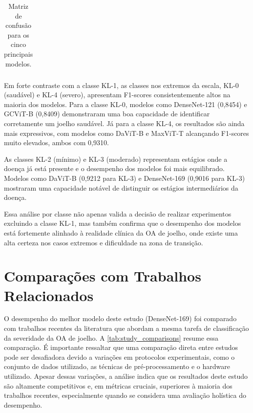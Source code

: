 \begin{table}[!htbp]
\begin{tabular}{|l|c|c|}
    \end{tabular}
    \caption{Matriz de confusão para os cinco principais modelos.}
    \label{tab:matrizes_confusao}
\end{table}

Em forte contraste com a classe KL-1, as classes nos extremos da escala, KL-0 (saudável) e KL-4 (severo), apresentam F1-scores consistentemente altos na maioria dos modelos. Para a classe KL-0, modelos como DenseNet-121 (0,8454) e GCViT-B (0,8409) demonstraram uma boa capacidade de identificar corretamente um joelho saudável. Já para a classe KL-4, os resultados são ainda mais expressivos, com modelos como DaViT-B e MaxViT-T alcançando F1-scores muito elevados, ambos com 0,9310.

As classes KL-2 (mínimo) e KL-3 (moderado) representam estágios onde a doença já está presente e o desempenho dos modelos foi mais equilibrado. Modelos como DaViT-B (0,9212 para KL-3) e DenseNet-169 (0,9016 para KL-3) mostraram uma capacidade notável de distinguir os estágios intermediários da doença.

Essa análise por classe não apenas valida a decisão de realizar experimentos excluindo a classe KL-1, mas também confirma que o desempenho dos modelos está fortemente alinhado à realidade clínica da OA de joelho, onde existe uma alta certeza nos casos extremos e dificuldade na zona de transição.

\section{Comparações com Trabalhos Relacionados}

O desempenho do melhor modelo deste estudo (DenseNet-169) foi comparado com trabalhos recentes da literatura que abordam a mesma tarefa de classificação da severidade da OA de joelho. A \autoref{tab:study_comparisons} resume essa comparação. É importante ressaltar que uma comparação direta entre estudos pode ser desafiadora devido a variações em protocolos experimentais, como o conjunto de dados utilizado, as técnicas de pré-processamento e o hardware utilizado. Apesar dessas variações, a análise indica que os resultados deste estudo são altamente competitivos e, em métricas cruciais, superiores à maioria dos trabalhos recentes, especialmente quando se considera uma avaliação holística do desempenho.

